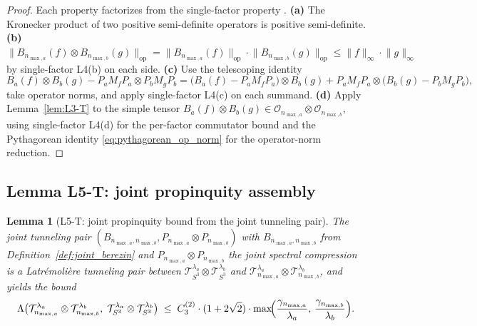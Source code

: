\documentclass[11pt,a4paper]{article}
\theoremstyle{plain}
\newtheorem{lemma}[theorem]{Lemma}
\theoremstyle{definition}
\newcommand{\nmaxa}{n_{\max,a}}
\newcommand{\nmaxb}{n_{\max,b}}
\newcommand{\sthree}{S^{3}}
\newcommand{\Op}{\mathcal{O}}
\newcommand{\Tcal}{\mathcal{T}}
\newcommand{\opnorm}[1]{\lVert #1 \rVert_{\mathrm{op}}}
\newcommand{\norm}[1]{\lVert #1 \rVert}
\newcommand{\Mat}{M}
\begin{document}
\begin{proof}
Each property factorizes from the single-factor property
\cite[Lemma~3.6]{loutey_paper38}.
\textbf{(a)} The Kronecker product of two positive semi-definite
operators is positive semi-definite.
\textbf{(b)} $\opnorm{B_{\nmaxa}(f) \otimes B_{\nmaxb}(g)} =
\opnorm{B_{\nmaxa}(f)} \cdot \opnorm{B_{\nmaxb}(g)} \le \norm{f}_\infty
\cdot \norm{g}_\infty$ by single-factor L4(b) on each side.
\textbf{(c)} Use the telescoping identity
\begin{equation*}
B_a(f) \otimes B_b(g) - P_a \Mat_f P_a \otimes P_b \Mat_g P_b
= \bigl(B_a(f) - P_a \Mat_f P_a\bigr) \otimes B_b(g)
  + P_a \Mat_f P_a \otimes \bigl(B_b(g) - P_b \Mat_g P_b\bigr),
\end{equation*}
take operator norms, and apply single-factor L4(c) on each summand.
\textbf{(d)} Apply Lemma~\ref{lem:L3-T} to the simple tensor $B_a(f)
\otimes B_b(g) \in \Op_{\nmaxa} \otimes \Op_{\nmaxb}$, using
single-factor L4(d) for the per-factor commutator bound and the
Pythagorean identity \eqref{eq:pythagorean_op_norm} for the
operator-norm reduction.
\end{proof}

\subsection{Lemma L5-T: joint propinquity assembly}\label{sec:L5-T}

\begin{lemma}[L5-T: joint propinquity bound from the joint tunneling
pair]\label{lem:L5-T}
The joint tunneling pair $(B_{\nmaxa, \nmaxb}, P_{\nmaxa} \otimes
P_{\nmaxb})$ with $B_{\nmaxa, \nmaxb}$ from
Definition~\ref{def:joint_berezin} and $P_{\nmaxa} \otimes P_{\nmaxb}$
the joint spectral compression is a Latr\'emoli\`ere tunneling pair
between $\Tcal_{\sthree}^{\lambda_a} \otimes \Tcal_{\sthree}^{\lambda_b}$
and $\Tcal_{\nmaxa}^{\lambda_a} \otimes \Tcal_{\nmaxb}^{\lambda_b}$, and
yields the bound
\begin{equation}\label{eq:L5_bound_T}
   \Lambda\bigl(\Tcal_{\nmaxa}^{\lambda_a} \otimes
                \Tcal_{\nmaxb}^{\lambda_b},\;
                \Tcal_{\sthree}^{\lambda_a} \otimes
                \Tcal_{\sthree}^{\lambda_b}\bigr)
   \;\le\; C_3^{(2)} \cdot (1 + 2\sqrt{2}) \cdot
            \max\!\Bigl(\frac{\gamma_{\nmaxa}}{\lambda_a},\,
                        \frac{\gamma_{\nmaxb}}{\lambda_b}\Bigr).
\end{equation}
\end{lemma}
\end{document}
